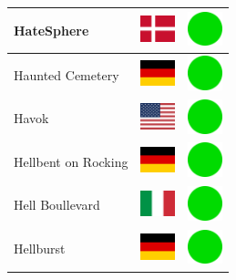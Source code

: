 \documentclass[12pt, a4paper, twoside]{report}
\begin{document}
\begin{center}
\begin{longtable}{|p{5cm}|p{2cm}|p{2cm}|}
 HateSphere                                                 & \includegraphics[width=1cm]{4x3/dk} &   \includegraphics[width=1cm]{likes/y} \\ \hline
 Haunted Cemetery                                           & \includegraphics[width=1cm]{4x3/de} &   \includegraphics[width=1cm]{likes/y} \\ \hline
 Havok                                                      & \includegraphics[width=1cm]{4x3/us} &   \includegraphics[width=1cm]{likes/y} \\ \hline
 Hellbent on Rocking                                        & \includegraphics[width=1cm]{4x3/de} &   \includegraphics[width=1cm]{likes/y} \\ \hline
 Hell Boullevard                                            & \includegraphics[width=1cm]{4x3/it} &   \includegraphics[width=1cm]{likes/y} \\ \hline
 Hellburst                                                  & \includegraphics[width=1cm]{4x3/de} &   \includegraphics[width=1cm]{likes/y} \\ \hline

\end{longtable}
\end{center}
\end{document}
